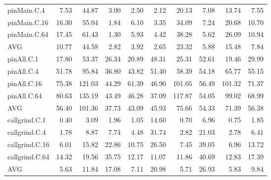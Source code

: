 \begin{table*}[]
\begin{center}
\begin{tabular}{lrrrrrrrrr}
 pinMain.C.4    &  7.53 &  44.87 &  3.00 &  2.50 &  2.12 &  20.13 &  7.08 &  13.74 &  7.55 \\
 pinMain.C.16   & 16.30 &  55.04 &  1.84 &  6.10 &  3.35 &  34.09 &  7.24 &  20.68 & 10.70 \\
 pinMain.C.64   & 17.45 &  61.43 &  1.30 &  5.93 &  4.42 &  38.28 &  5.62 &  26.09 & 10.94 \\
 AVG            & 10.77 &  44.58 &  2.82 &  3.92 &  2.65 &  23.32 &  5.88 &  15.48 &  7.84 \\
 pinAll.C.1     & 17.80 &  53.37 & 26.34 & 20.89 & 48.31 &  25.31 & 52.61 &  19.46 & 29.99 \\
 pinAll.C.4     & 51.78 &  95.84 & 36.80 & 43.82 & 51.40 &  58.39 & 54.18 &  65.77 & 55.15 \\
 pinAll.C.16    & 75.38 & 121.03 & 44.29 & 61.39 & 46.90 & 101.05 & 56.49 & 101.32 & 71.37 \\
 pinAll.C.64    & 80.63 & 135.19 & 43.49 & 46.28 & 37.09 & 117.87 & 54.05 &  99.02 & 68.99 \\
 AVG            & 56.40 & 101.36 & 37.73 & 43.09 & 45.93 &  75.66 & 54.33 &  71.39 & 56.38 \\
 callgrind.C.1  &  0.40 &   3.09 &  1.96 &  1.05 & 14.60 &   0.70 &  6.96 &   0.75 &  1.85 \\
 callgrind.C.4  &  1.78 &   8.87 &  7.74 &  4.48 & 31.74 &   2.82 & 21.03 &   2.78 &  6.41 \\
 callgrind.C.16 &  6.01 &  15.82 & 22.86 & 10.75 & 26.50 &   7.45 & 39.05 &   6.96 & 13.72 \\
 callgrind.C.64 & 14.32 &  19.56 & 35.75 & 12.17 & 11.07 &  11.86 & 40.69 &  12.83 & 17.39 \\
 AVG            &  5.63 &  11.84 & 17.08 &  7.11 & 20.98 &   5.71 & 26.93 &   5.83 &  9.84 \\
\hline
\end{tabular}
\end{center}
\end{table*}
